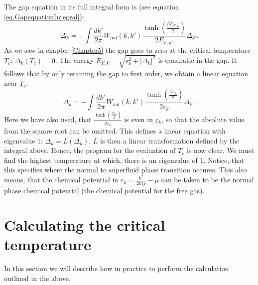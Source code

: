 The gap equation in its full integral form is (see equation \eqref{eq.GapequationIntegral}):
\begin{equation}
\Delta_k = - \int \frac{dk'}{2\pi} W_{\text{ind}}(k,k')\frac{\tanh\left(\frac{\beta E_{F,k}}{2}\right)}{2E_{F,k'}}\Delta_{k'}. \nonumber
\end{equation} 
As we saw in chapter \ref{Chapter5} the gap goes to zero at the critical temperature $T_c$: $\Delta_k(T_c) = 0$. The energy $E_{F,k} = \sqrt{\epsilon_k^2 + |\Delta_k|^2}$ is quadratic in the gap. It follows that by only retaining the gap to first order, we obtain a linear equation near $T_c$:
\begin{equation}
\Delta_k = - \int \frac{dk'}{2\pi} W_{\text{ind}}(k,k')\frac{\tanh\left(\frac{\beta \varepsilon_k}{2}\right)}{2\varepsilon_k} \Delta_{k'}.
\label{eq.GapequationIntegralLinear}
\end{equation} 
Here we have also used, that $\frac{\tanh\left(\frac{\beta \varepsilon_k}{2}\right)}{2\varepsilon_k}$ is even in $\varepsilon_k$, so that the absolute value from the square root can be omitted. This defines a linear equation with eigenvalue $1$: $\Delta_k = L(\Delta_k)$. $L$ is then a linear transformation defined by the integral above. Hence, the program for the evaluation of $T_c$ is now clear. We must find the highest temperature at which, there is an eigenvalue of 1. Notice, that this specifies where the normal to superfluid phase transition occures. This also means, that the chemical potential in $\varepsilon_k = \frac{k^2}{2m_F} - \mu$ can be taken to be the normal phase chemical potential (the chemical potential for the free gas). 

\section{Calculating the critical temperature} \label{sec.criticaltemperature.numerical}
In this section we will describe how in practice to perform the calculation outlined in the above. 

